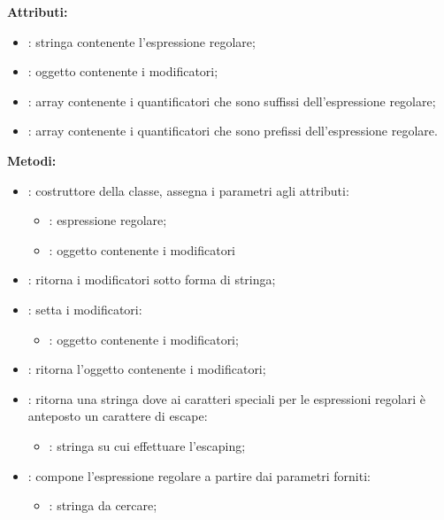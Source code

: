 %
\textbf{Attributi:}
\begin{itemize}
	\item {}: stringa contenente l'espressione regolare;
	\item {}: oggetto contenente i modificatori;
	\item {}: array contenente i quantificatori che sono suffissi dell'espressione regolare;
	\item {}: array contenente i quantificatori che sono prefissi dell'espressione regolare.
\end{itemize}

\textbf{Metodi:}
\begin{itemize}
	\item {}: costruttore della classe, assegna i parametri agli attributi:
	\begin{itemize}
		\item {}: espressione regolare;
		\item {}: oggetto contenente i modificatori
	\end{itemize}
	\item {}: ritorna i modificatori sotto forma di stringa;
	\item {}: setta i modificatori:
	\begin{itemize}
		\item {}: oggetto contenente i modificatori;
	\end{itemize}
	\item {}: ritorna l'oggetto contenente i modificatori;
	\item {}: ritorna una stringa dove ai caratteri speciali per le espressioni regolari è anteposto un carattere di escape:
	\begin{itemize}
		\item {}: stringa su cui effettuare l'escaping;
	\end{itemize}
	\item {}: compone l'espressione regolare a partire dai parametri forniti:
	\begin{itemize}
		\item {}: stringa da cercare;

\end{itemize}
\end{itemize}
